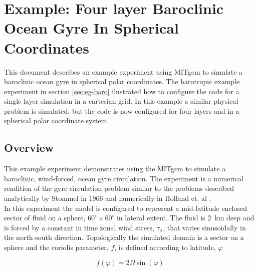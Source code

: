 
\section{Example: Four layer Baroclinic Ocean Gyre In Spherical Coordinates}
\label{sec:eg-fourlayer}


%
%

This document describes an example experiment using MITgcm
to simulate a baroclinic ocean gyre in spherical
polar coordinates. The barotropic
example experiment in section \ref{sec:eg-baro}
ilustrated how to configure the code for a single layer 
simulation in a cartesian grid. In this example a similar physical problem
is simulated, but the code is now configured
for four layers and in a spherical polar coordinate system.

\subsection{Overview}

This example experiment demonstrates using the MITgcm to simulate
a baroclinic, wind-forced, ocean gyre circulation. The experiment 
is a numerical rendition of the gyre circulation problem simliar
to the problems described analytically by Stommel in 1966 
\cite{Stommel66} and numerically in Holland et. al \cite{Holland75}.
\\

In this experiment the model is configured to represent a mid-latitude 
enclosed sector of fluid on a sphere, $60^{\circ} \times 60^{\circ}$ in 
lateral extent. The fluid is $2$~km deep and is forced
by a constant in time zonal wind stress, $\tau_{\lambda}$, that varies 
sinusoidally in the north-south direction. Topologically the simulated 
domain is a sector on a sphere and the coriolis parameter, $f$, is defined 
according to latitude, $\varphi$

\begin{equation}
\label{EQ:fcori}
f(\varphi) = 2 \Omega \sin( \varphi )
\end{equation}
 
